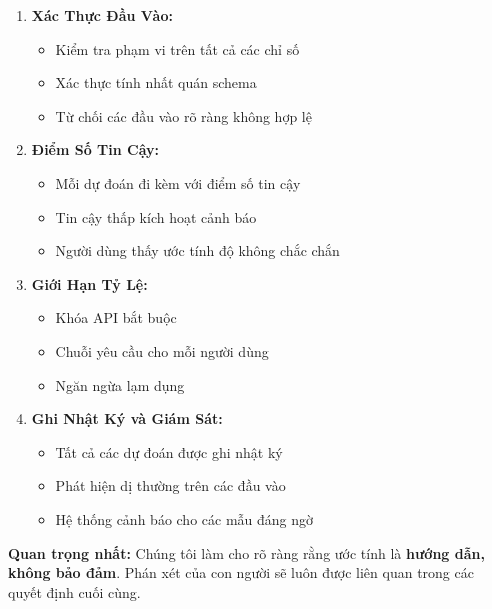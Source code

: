 \documentclass[12pt,a4paper]{article}
\begin{document}
\begin{enumerate}
    \item \textbf{Xác Thực Đầu Vào:}
    \begin{itemize}
        \item Kiểm tra phạm vi trên tất cả các chỉ số
        \item Xác thực tính nhất quán schema
        \item Từ chối các đầu vào rõ ràng không hợp lệ
    \end{itemize}
    
    \item \textbf{Điểm Số Tin Cậy:}
    \begin{itemize}
        \item Mỗi dự đoán đi kèm với điểm số tin cậy
        \item Tin cậy thấp kích hoạt cảnh báo
        \item Người dùng thấy ước tính độ không chắc chắn
    \end{itemize}
    
    \item \textbf{Giới Hạn Tỷ Lệ:}
    \begin{itemize}
        \item Khóa API bắt buộc
        \item Chuỗi yêu cầu cho mỗi người dùng
        \item Ngăn ngừa lạm dụng
    \end{itemize}
    
    \item \textbf{Ghi Nhật Ký và Giám Sát:}
    \begin{itemize}
        \item Tất cả các dự đoán được ghi nhật ký
        \item Phát hiện dị thường trên các đầu vào
        \item Hệ thống cảnh báo cho các mẫu đáng ngờ
    \end{itemize}
\end{enumerate}

\textbf{Quan trọng nhất:} Chúng tôi làm cho rõ ràng rằng ước tính là \textbf{hướng dẫn, không bảo đảm}. Phán xét của con người sẽ luôn được liên quan trong các quyết định cuối cùng.
\end{document}

